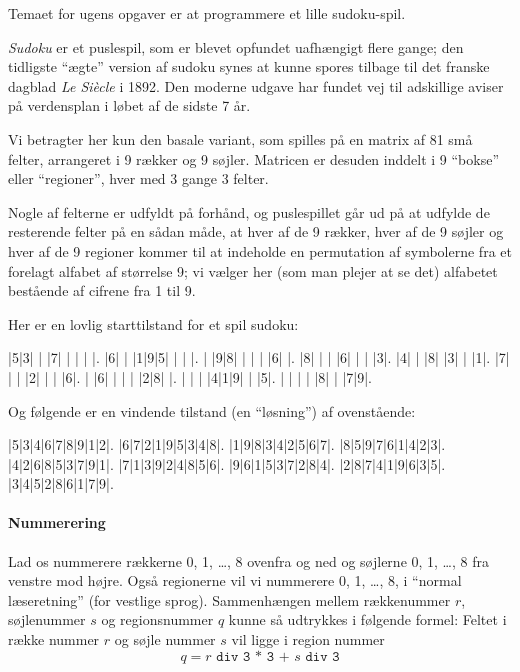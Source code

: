\documentclass[a4paper]{article}
\begin{document}
Temaet for ugens opgaver er at programmere et lille sudoku-spil.

\emph{Sudoku} er et puslespil, som er blevet opfundet uafh{\ae}ngigt
flere gange; den tidligste ``{\ae}gte'' version af sudoku synes at kunne spores
tilbage til det franske dagblad \emph{Le Si{\`e}cle} i 1892. Den moderne udgave
har fundet vej til adskillige aviser p{\aa} verdensplan i l{\o}bet af de sidste 7 {\aa}r.

Vi betragter her kun den basale variant, som spilles p{\aa} en matrix af 81
sm{\aa} felter, arrangeret i 9 r{\ae}kker og 9 s{\o}jler.  Matricen er desuden
inddelt i 9 ``bokse'' eller ``regioner'', hver med 3 gange 3 felter.

Nogle af felterne er udfyldt p{\aa} forh{\aa}nd, og puslespillet g{\aa}r ud p{\aa}
at udfylde de resterende felter p{\aa} en s{\aa}dan m{\aa}de, at hver af de
9 r{\ae}kker, hver af de 9 s{\o}jler og hver af de 9 regioner kommer til at
indeholde en permutation af symbolerne fra et forelagt alfabet af st{\o}rrelse 9;
vi v{\ae}lger her (som man plejer at se det) alfabetet best{\aa}ende af cifrene fra 1 til 9.

Her er en lovlig starttilstand for et spil sudoku:

\begin{sudoku}
|5|3| | |7| | | | |.
|6| | |1|9|5| | | |.
| |9|8| | | | |6| |.
|8| | | |6| | | |3|.
|4| | |8| |3| | |1|.
|7| | | |2| | | |6|.
| |6| | | | |2|8| |.
| | | |4|1|9| | |5|.
| | | | |8| | |7|9|.
\end{sudoku}

Og f{\o}lgende er en vindende tilstand (en ``l{\o}sning'') af ovenst{\aa}ende:

\begin{sudoku}
|5|3|4|6|7|8|9|1|2|.
|6|7|2|1|9|5|3|4|8|.
|1|9|8|3|4|2|5|6|7|.
|8|5|9|7|6|1|4|2|3|.
|4|2|6|8|5|3|7|9|1|.
|7|1|3|9|2|4|8|5|6|.
|9|6|1|5|3|7|2|8|4|.
|2|8|7|4|1|9|6|3|5|.
|3|4|5|2|8|6|1|7|9|.
\end{sudoku}

\paragraph{Nummerering}

Lad os nummerere r{\ae}kkerne 0, 1, \ldots, 8 ovenfra og ned og s{\o}jlerne
0, 1, \ldots, 8 fra venstre mod h{\o}jre.  Ogs{\aa} regionerne vil vi
nummerere 0, 1, \ldots, 8, i ``normal l{\ae}seretning'' (for vestlige sprog).
Sammenh{\ae}ngen mellem r{\ae}kkenummer $r$,
s{\o}jlenummer $s$ og regionsnummer $q$ kunne s{\aa} udtrykkes i f{\o}lgende
formel:  Feltet i r{\ae}kke nummer $r$ og s{\o}jle nummer $s$
vil ligge i region nummer
\[q = \texttt{$r$ div 3 * 3 + $s$ div 3}\]
\end{document}
